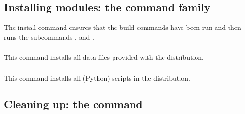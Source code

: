 \documentclass{howto}
\begin{document}
\subsubsection{\protect{}}
\label{build-cmd}

\subsubsection{\protect{}}
\label{build-py-cmd}

\subsubsection{\protect{}}
\label{build-ext-cmd}

\subsubsection{\protect{}}
\label{build-clib-cmd}


\subsection{Installing modules: the \protect{} command family}
\label{install-cmd}

The install command ensures that the build commands have been run and then
runs the subcommands ,
 and
.

\subsubsection{\protect{}}
\label{install-lib-cmd}

\subsubsection{\protect{}}
\label{install-data-cmd}
This command installs all data files provided with the distribution.

\subsubsection{\protect{}}
\label{install-scripts-cmd}
This command installs all (Python) scripts in the distribution.


\subsection{Cleaning up: the \protect{} command}
\label{clean-cmd}
\end{document}
